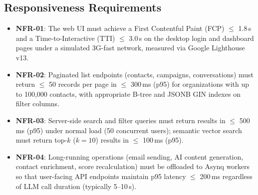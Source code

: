 \documentclass[a4paper]{article}
\begin{document}
\subsection{Responsiveness Requirements}
\begin{itemize}
    \item \textbf{NFR-01}: The web UI must achieve a First
    Contentful Paint (FCP) $\leq$ 1.8\,s and a Time-to-Interactive
    (TTI) $\leq$ 3.0\,s on the desktop login and dashboard pages
    under a simulated 3G-fast network, measured via Google
    Lighthouse v13.
    \item \textbf{NFR-02}: Paginated list endpoints (contacts,
    campaigns, conversations) must return $\leq$ 50 records per
    page in $\leq$ 300\,ms (p95) for organizations with up to
    100{,}000 contacts, with appropriate B-tree and JSONB GIN
    indexes on filter columns.
    \item \textbf{NFR-03}: Server-side search and filter queries
    must return results in $\leq$ 500\,ms (p95) under normal load
    (50 concurrent users); semantic vector search must return
    top-$k$ ($k = 10$) results in $\leq$ 100\,ms (p95).
    \item \textbf{NFR-04}: Long-running operations (email sending,
    AI content generation, contact enrichment, score
    recalculation) must be offloaded to Asynq workers so that
    user-facing API endpoints maintain p95 latency $\leq$ 200\,ms
    regardless of LLM call duration (typically 5--10\,s).
\end{itemize}
\end{document}
